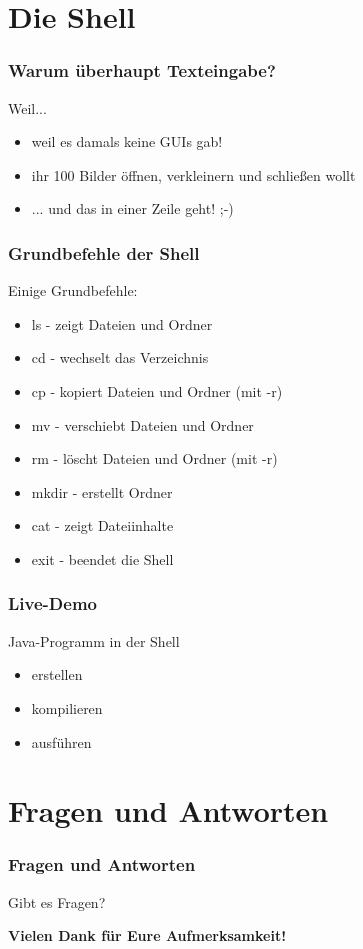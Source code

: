 \documentclass[12pt]{beamer}
\begin{document}
\section{Die Shell}

\begin{frame}
	\frametitle{Warum überhaupt Texteingabe?}

	Weil...
	\begin{itemize}
		\pause
		\item weil es damals keine GUIs gab!
		\pause
		\item ihr 100 Bilder öffnen, verkleinern und schließen wollt
		\pause
		\item ... und das in einer Zeile geht! ;-)
	\end{itemize}
\end{frame}

\begin{frame}

	\frametitle{Grundbefehle der Shell}
	
	Einige Grundbefehle:
	\begin{itemize}
		\pause
		\item	ls - zeigt Dateien und Ordner
		\pause
		\item cd - wechselt das Verzeichnis
		\pause
		\item	cp - kopiert Dateien und Ordner (mit -r)
		\pause
		\item	mv - verschiebt Dateien und Ordner
		\pause
		\item rm - löscht Dateien und Ordner (mit -r)
		\pause
		\item mkdir - erstellt Ordner
		\pause
		\item cat - zeigt Dateiinhalte
		\pause
		\item exit - beendet die Shell
	\end{itemize}
\end{frame}

\begin{frame}

	\frametitle{Live-Demo}

	Java-Programm in der Shell
	\begin{itemize}
		\item erstellen
		\item kompilieren
		\item ausführen
	\end{itemize}

\end{frame}

\section{Fragen und Antworten}

\begin{frame}
	\frametitle{Fragen und Antworten}

	\begin{center}
		\large Gibt es Fragen?
	\end{center}
	\pause
	\centerline{\textbf{Vielen Dank für Eure Aufmerksamkeit!}}
\end{frame}
\end{document}
